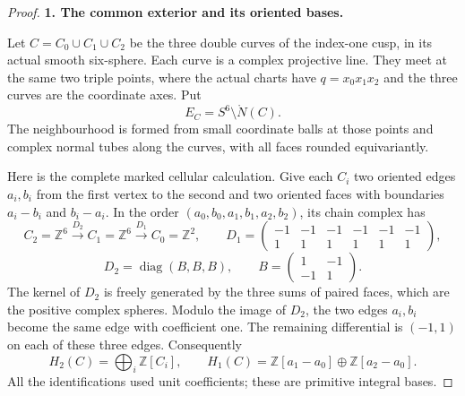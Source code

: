 \begin{proof}
\par\medskip\noindent\textbf{1. The common exterior and its oriented bases.}\enspace

Let \(C=C_0\cup C_1\cup C_2\) be the three double curves of the
index-one cusp, in its actual smooth six-sphere. Each curve is a
complex projective line. They meet at the same two triple points,
where the actual charts have \(q=x_0x_1x_2\) and the three curves
are the coordinate axes. Put
\[
 E_C=S^6\setminus\mathring N(C).
\]
The neighbourhood is formed from small coordinate balls at those
points and complex normal tubes along the curves, with all faces
rounded equivariantly.

Here is the complete marked cellular calculation. Give each
\(C_i\) two oriented edges \(a_i,b_i\) from the first vertex
to the second and two oriented faces with boundaries
\(a_i-b_i\) and \(b_i-a_i\). In the order
\((a_0,b_0,a_1,b_1,a_2,b_2)\), its chain complex has
\[
 C_2=\mathbb Z^6\xrightarrow{D_2}C_1=\mathbb Z^6
                      \xrightarrow{D_1}C_0=\mathbb Z^2,
 \qquad
 D_1=\begin{pmatrix}-1&-1&-1&-1&-1&-1\\
                     1&1&1&1&1&1\end{pmatrix},
\]
\[
 D_2=\operatorname{diag}(B,B,B),\qquad
               B=\begin{pmatrix}1&-1\\-1&1\end{pmatrix}.
\]
The kernel of \(D_2\) is freely generated by the three
sums of paired faces, which are the positive complex
spheres. Modulo the image of \(D_2\), the two edges
\(a_i,b_i\) become the same edge with coefficient one.
The remaining differential is
\((-1,1)\) on each of these three edges. Consequently
\[
 H_2(C)=\bigoplus_i\mathbb Z[C_i],\qquad
 H_1(C)=\mathbb Z[a_1-a_0]\oplus\mathbb Z[a_2-a_0].
\]
All the identifications used unit coefficients; these
are primitive integral bases.


\end{proof}

